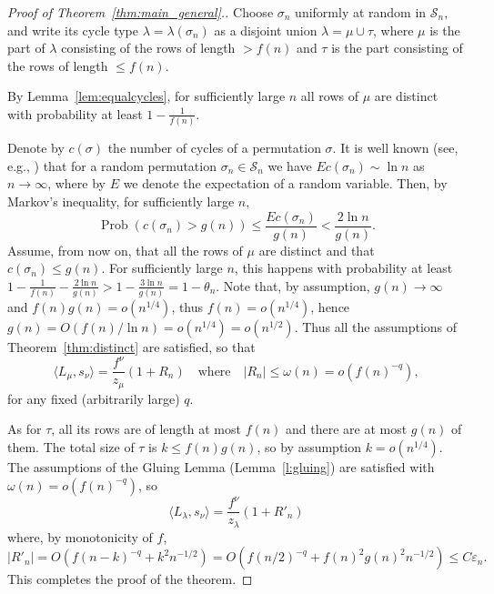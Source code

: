 \documentclass[12pt]%
{amsart}
\renewcommand\S{{\mathcal S}}
\newcommand{\la}{{\lambda}}
\newcommand{\si}{{\sigma}}
\newcommand{\om}{{\omega}}
\newcommand{\Prob}{{\rm Prob}}
\def\magenta#1{{\color{magenta}{#1}}}
\theoremstyle{plain}
\theoremstyle{definition}
\theoremstyle{remark}
\newcommand{\ve}{\varepsilon}
\begin{document}
\begin{proof}[Proof of Theorem~\ref{thm:main_general}.] 
    Choose $\si_n$ uniformly at random in $\S_n$, and write its cycle type $\la=\la(\si_n)$ as a disjoint union $\la=\mu\cup\tau$, where $\mu$ is the part of $\la$ consisting of the rows of length $> f(n)$ and $\tau$ is the part consisting of the rows of length $\le f(n)$.
    
    By Lemma~\ref{lem:equalcycles}, for sufficiently large $n$ all rows of $\mu$ are distinct with probability at least $1-\frac{1}{f(n)}$. 
    
    Denote by $c(\si)$ the number of cycles of a permutation $\si$. It is well known (see, e.g., \cite[(6.5)]{Feller}) that for a random permutation $\si_n\in\S_n$ we have 
    $Ec(\si_n)\sim\ln n$ as $n\to\infty$, where by $E$ we denote the expectation of a random variable. 
    Then, by Markov's inequality, for sufficiently large $n$,
    \[
        \operatorname{Prob}(c(\si_n) > g(n))
        \le \frac{Ec(\si_n)}{g(n)}
        < \frac{2 \ln n}{g(n)}.
    \]
    Assume, from now on, that all the rows of $\mu$ are distinct and that $c(\si_n) \le g(n)$.
    For sufficiently large $n$, this happens with probability at least $1 - \frac{1}{f(n)} - \frac{2 \ln n}{g(n)} > 1 - \frac{3 \ln n}{g(n)} = 1-\theta_n$.
    Note that, by assumption, $g(n) \to \infty$ and $f(n) g(n) = o(n^{1/4})$, thus $f(n) = o(n^{1/4})$, hence $g(n) = O(f(n) / \ln n) = o(n^{1/4}) = o(n^{1/2})$.
    Thus all the assumptions of Theorem~\ref{thm:distinct} are satisfied, so that
    \[
        \langle L_{\mu},s_\nu \rangle = \frac{f^\nu}{z_{\mu}}(1+R_n)
        \quad \text{where} \quad
        |R_n| \le \om(n) = o(f(n)^{-q}),
    \] 
    for any fixed (arbitrarily large) $q$.
    
    As for $\tau$, all its rows are of length at most $f(n)$ and
    there are at most $g(n)$ of them. 
    The total size of $\tau$ is $k \le f(n) g(n)$, so by assumption $k = o(n^{1/4})$. 
    The assumptions of the Gluing Lemma (Lemma~\ref{l:gluing}) are satisfied with $\om(n) = o\!\left(f(n)^{-q} \right)$, so
    \[
        \langle L_{\la},s_\nu \rangle 
    = \frac{f^\nu}{z_\la}(1+R'_n)
    \]
    where, by monotonicity of $f$,
    \[
        |R'_n| 
        = O(f(n-k)^{-q} + k^2 n^{-1/2})
        = O(f(n/2)^{-q} + f(n)^2 g(n)^2 n^{-1/2}) \le C \ve_n.
    \]
    This completes the proof of the theorem.
\end{proof}
\end{document}
